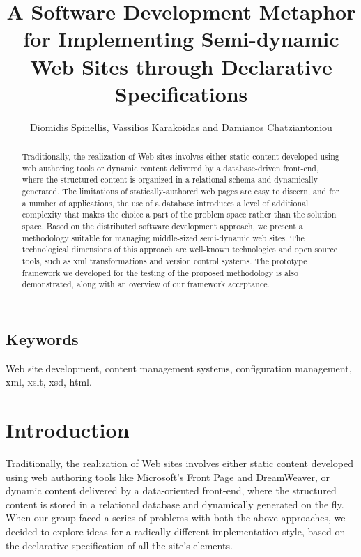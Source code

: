 \documentclass{elsart}
\begin{document}
\begin{frontmatter}

\title{A Software Development Metaphor for Implementing Semi-dynamic Web Sites through Declarative Specifications}

\author{Diomidis Spinellis, Vassilios Karakoidas and Damianos Chatziantoniou}

\address{Department of Management Science and Technology, Athens University of Economics and Business, Greece email:\{dds, bkarak, damianos\}@aueb.gr}

\maketitle

\begin{abstract}
Traditionally, the realization of Web sites involves either
static content developed using web authoring tools or dynamic
content delivered by a database-driven front-end,
where the structured content is organized
in a relational schema and dynamically generated.
The limitations of statically-authored web pages are easy to discern, and
for a number of applications, the use of a database
introduces a level of additional complexity that
makes the choice a part of the problem space rather than the solution space.
Based on the distributed software development approach, we present a methodology suitable for managing 
middle-sized semi-dynamic web sites. The technological dimensions of this
approach are well-known technologies and open source tools,
such as {\sc xml} transformations and
version control systems.
The prototype framework we developed for the testing of the proposed methodology
is also demonstrated, along with an overview of our framework acceptance.
\end{abstract}

\subsection*{Keywords}
Web site development,
content management systems,
configuration management,
{\sc xml},
{\sc xslt},
{\sc xsd},
{\sc html}.

\end{frontmatter}

\section{Introduction}
\label{sec:intro}
Traditionally, the realization of Web sites involves either
static content developed using web authoring tools like
Microsoft's Front Page and DreamWeaver, or dynamic
content delivered by a data-oriented front-end,
where the structured content is stored in a relational database 
and dynamically generated on the fly.
When our group faced a series of problems with both the above approaches,
we decided to explore ideas for a radically different
implementation style, based on the declarative specification
of all the site's elements.
\end{document}
